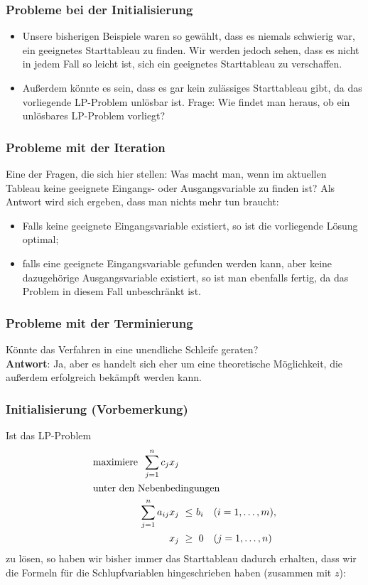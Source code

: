 \documentclass[smaller]{beamer}
\begin{document}
\begin{frame}
  \frametitle{Probleme bei der Initialisierung}
  \begin{itemize}
  \item Unsere bisherigen Beispiele waren so gewählt, dass es niemals schwierig war, ein geeignetes Starttableau zu finden. \alert{Wir werden jedoch sehen, dass es nicht in jedem Fall so leicht ist, sich ein geeignetes Starttableau zu verschaffen}. 
  \item Außerdem könnte es sein, dass es gar kein zulässiges Starttableau gibt, da das vorliegende LP-Problem unlösbar ist. \alert{Frage: Wie findet man heraus, ob ein unlösbares LP-Problem vorliegt?}
  \end{itemize}
\end{frame}

\begin{frame}
 \frametitle{Probleme mit der Iteration}
 Eine der Fragen, die sich hier stellen: Was macht man, wenn im aktuellen Tableau keine geeignete Eingangs- oder Ausgangsvariable zu finden ist? Als Antwort wird sich ergeben, dass man nichts mehr tun braucht:
 \begin{itemize}
 \item Falls keine geeignete Eingangsvariable existiert, so ist die vorliegende Lösung \alert{optimal};
 \item falls eine geeignete Eingangsvariable gefunden werden kann, aber keine dazugehörige Ausgangsvariable existiert, so ist man ebenfalls fertig, da das Problem in diesem Fall \alert{unbeschränkt} ist.
 \end{itemize}
\end{frame}

\begin{frame}
 \frametitle{Probleme mit der Terminierung}
 Könnte das Verfahren in eine unendliche Schleife geraten? \\ \vspace*{0.2cm}
 \textbf{Antwort}: Ja, aber es handelt sich eher um eine theoretische Möglichkeit, die außerdem erfolgreich bekämpft werden kann.
\end{frame}

\begin{frame}
 \frametitle{Initialisierung (Vorbemerkung)}
 Ist das LP-Problem
\begin{align}
\begin{alignedat}{4}
\label{eq:3:1}
& \text{maximiere } & \sum\limits_{j=1}^{n}{c_jx_j} & & & \\
& \rlap{unter den Nebenbedingungen} & & & & \\
&& \sum\limits_{j=1}^{n}{a_{ij}x_j} &\ \leq &\ b_i & \quad (i=1,\ldots,m), \\
&& x_j &\ \geq &\ 0 & \quad (j=1,\ldots,n)\
\end{alignedat}
\end{align}
zu lösen, so haben wir bisher immer das Starttableau dadurch erhalten, dass wir die Formeln für die Schlupfvariablen hingeschrieben haben (zusammen mit $z$):
\end{frame}
\end{document}

